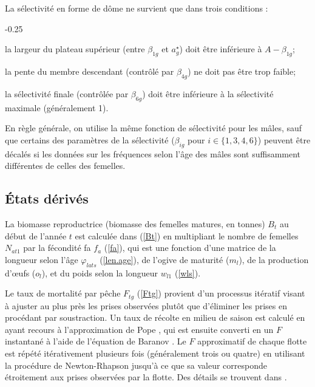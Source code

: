 \documentclass[11pt]{book}
\newcommand{\eref}[1]{(\ref{#1})}
\begin{document}
La s\'{e}lectivit\'{e} en forme de d\^{o}me ne survient que dans trois conditions :\\
\begin{itemize_csas}{-0.25}{}
  \item la largeur du plateau sup\'{e}rieur (entre $\beta_{1g}$ et $a_g^{\star}$) doit \^{e}tre inf\'{e}rieure \`{a} $A - \beta_{1g}$;
  \item la pente du membre descendant (contr\^{o}l\'{e} par $\beta_{4g}$) ne doit pas \^{e}tre trop faible; 
  \item la s\'{e}lectivit\'{e} finale (contr\^{o}l\'{e}e par $\beta_{6g}$) doit \^{e}tre inf\'{e}rieure \`{a} la s\'{e}lectivit\'{e} maximale (g\'{e}n\'{e}ralement 1).
\end{itemize_csas}
En r\`{e}gle g\'{e}n\'{e}rale, on utilise la m\^{e}me fonction de s\'{e}lectivit\'{e} pour les m\^{a}les, sauf que certains des param\`{e}tres de la s\'{e}lectivit\'{e} ($\beta_{ig}$ pour $i\in \{1,3,4,6\}$) peuvent \^{e}tre d\'{e}cal\'{e}s si les donn\'{e}es sur les fr\'{e}quences selon l'\^{a}ge des m\^{a}les sont suffisamment diff\'{e}rentes de celles des femelles.

\subsection{\'{E}tats d\'{e}riv\'{e}s}

La biomasse reproductrice (biomasse des femelles matures, en tonnes) $B_t$ au d\'{e}but de l'ann\'{e}e $t$ est calcul\'{e}e dans \eref{Bt} en multipliant le nombre de femelles $N_{at1}$ par la f\'{e}condit\'{e} fa $f_a$ \eref{fa}, qui est une fonction d'une matrice de la longueur selon l'\^{a}ge $\varphi_{lats}$ \eref{len.age}, de l'ogive de maturit\'{e} ($m_l$), de la production d'{\oe}ufs ($o_l$), et du poids selon la longueur $w_{l1}$ \eref{wls}.

Le taux de mortalit\'{e} par p\^{e}che $F_{tg}$ \eref{Ftg} provient d'un processus it\'{e}ratif visant \`{a} ajuster au plus pr\`{e}s les prises observ\'{e}es plut\^{o}t que d'\'{e}liminer les prises en proc\'{e}dant par soustraction. Un taux de r\'{e}colte en milieu de saison est calcul\'{e} en ayant recours \`{a} l'approximation de Pope \citep{Pope:1972}, qui est ensuite converti en un $F$ instantan\'{e} \`{a} l'aide de l'\'{e}quation de Baranov \citep{Baranov:1918}.
Le $F$ approximatif de chaque flotte est r\'{e}p\'{e}t\'{e} it\'{e}rativement plusieurs fois (g\'{e}n\'{e}ralement trois ou quatre) en utilisant la proc\'{e}dure de Newton-Rhapson jusqu'\`{a} ce que sa valeur corresponde \'{e}troitement aux prises observ\'{e}es par la flotte. Des d\'{e}tails se trouvent dans \citet{Methot-Wetzel:2013}.
\end{document}
